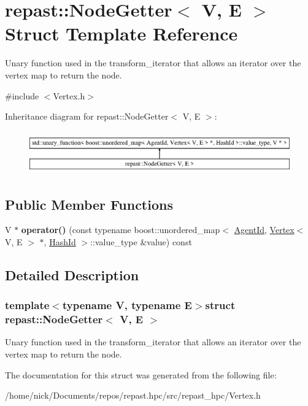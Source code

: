 \hypertarget{structrepast_1_1_node_getter}{\section{repast\-:\-:Node\-Getter$<$ V, E $>$ Struct Template Reference}
\label{structrepast_1_1_node_getter}
}


Unary function used in the transform\-\_\-iterator that allows an iterator over the vertex map to return the node.  




{\ttfamily \#include $<$Vertex.\-h$>$}

Inheritance diagram for repast\-:\-:Node\-Getter$<$ V, E $>$\-:\begin{figure}[H]
\begin{center}
\leavevmode
\includegraphics[height=1.876047cm]{structrepast_1_1_node_getter}
\end{center}
\end{figure}
\subsection*{Public Member Functions}
\begin{DoxyCompactItemize}
\item 
\hypertarget{structrepast_1_1_node_getter_af738a8ad2b713303a0e95132588864fb}{V $\ast$ {\bfseries operator()} (const typename boost\-::unordered\-\_\-map$<$ \hyperlink{classrepast_1_1_agent_id}{Agent\-Id}, \hyperlink{classrepast_1_1_vertex}{Vertex}$<$ V, E $>$ $\ast$, \hyperlink{structrepast_1_1_hash_id}{Hash\-Id} $>$\-::value\-\_\-type \&value) const }\label{structrepast_1_1_node_getter_af738a8ad2b713303a0e95132588864fb}

\end{DoxyCompactItemize}


\subsection{Detailed Description}
\subsubsection*{template$<$typename V, typename E$>$struct repast\-::\-Node\-Getter$<$ V, E $>$}

Unary function used in the transform\-\_\-iterator that allows an iterator over the vertex map to return the node. 

The documentation for this struct was generated from the following file\-:\begin{DoxyCompactItemize}
\item 
/home/nick/\-Documents/repos/repast.\-hpc/src/repast\-\_\-hpc/Vertex.\-h\end{DoxyCompactItemize}
